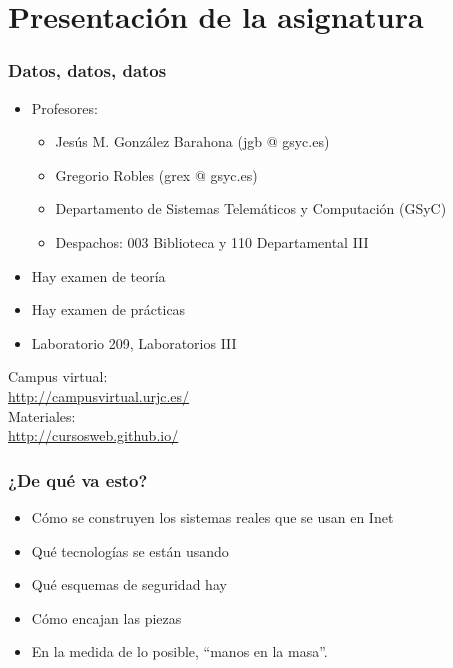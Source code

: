 %


\section{Presentación de la asignatura}


\begin{frame}
\frametitle{Datos, datos, datos}

\begin{itemize}
\item Profesores:
  \begin{itemize}
  \item Jesús M. González Barahona (jgb @ gsyc.es)
  \item Gregorio Robles (grex @ gsyc.es)
  \item Departamento de Sistemas Telemáticos y Computación (GSyC)
  \item Despachos: 003 Biblioteca y 110 Departamental III
  \end{itemize}
\item Hay examen de teoría
\item Hay examen de prácticas
\item Laboratorio 209, Laboratorios III
\end{itemize}

\begin{flushright}
Campus virtual: \\
{\small \url{http://campusvirtual.urjc.es/}} \\
Materiales: \\
{\small \url{http://cursosweb.github.io/}} \\
\end{flushright}

\end{frame}


\begin{frame}
\frametitle{¿De qué va esto?}


\begin{itemize}
\item Cómo se construyen los sistemas reales que se usan en Inet
\item Qué tecnologías se están usando
\item Qué esquemas de seguridad hay
\item Cómo encajan las piezas
\item En la medida de lo posible, ``manos en la masa''.
\end{itemize}


\end{frame}


